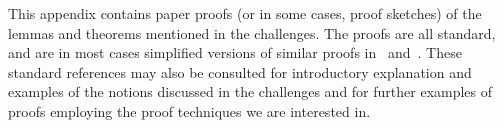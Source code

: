 \long{}
\newenvironment{metanote}{\begin{quote}\message{note!}[\begingroup\it}%
                         {\endgroup]\end{quote}}
\long{}

This appendix contains paper proofs (or in some cases, proof sketches) of the lemmas and theorems mentioned in the challenges.
The proofs are all standard, and are in most cases simplified versions of similar proofs in~\cite{picalcbook} and~\cite{Vasconcelos2012}.
These standard references may also be consulted for introductory explanation and examples of the notions discussed in the challenges and for further examples of proofs employing the proof techniques we are interested in.



